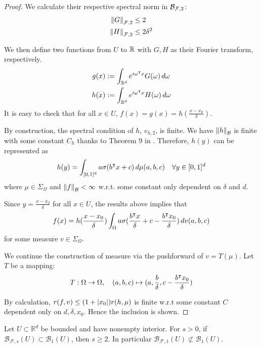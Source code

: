 \begin{proof}
We calculate their respective spectral norm in $\mathcal{B}_{\mathcal{F}, 2}$:
\begin{align}
    \left\| G \right\|_{\mathcal{F},2} &\leq 2 \\
    \left\| H \right\|_{\mathcal{F},2} &\leq 2\delta^2
\end{align}

We then define two functions from $U$ to $\mathbb{R}$ with $G,H$ as their Fourier
transform, respectively.
\begin{align*}
    g(x) &:= \int_{\mathbb{R}^d} e^{i\omega{}^{\intercal} x} G(\omega)\,d\omega\\
    h(x) &:= \int_{\mathbb{R}^d} e^{i\omega{}^{\intercal} x} H(\omega)\,d\omega\\
\end{align*}
It is easy to check that for all $x \in U$, $f(x)=g(x)=h(\frac{x-x_0}{\delta})$.

By construction, the spectral condition of $h$, $v_{h,2}$, is finite. We have
$\left\| h \right\|_{\mathcal{B}}$ is finite with some constant $C_h$ thanks to Theorem 9
in \cite{eMathematicalUnderstandingNeural2020}. Therefore, $h(y)$ can be
represented as
\begin{equation}
    h(y) = \int_{[0,1]^d} a \sigma(b{}^{\intercal} x + c) \,d\mu(a,b,c) \quad
    \forall y \in [0,1]^d
\end{equation}
where $\mu \in \Sigma_{\Omega}$ and $\left\| f \right\|_{\mathcal{B}} < \infty$ w.r.t. some
constant only dependent on $\delta$ and $d$.

Since $y=\frac{x-x_0}{\delta}$ for all $x\in U$, the results above implies that 
\begin{equation}
    f(x) = h(\frac{x-x_0}{\delta}) \int_{\Omega} a 
    \sigma(\frac{b{}^{\intercal} x}{\delta} + c - \frac{b{}^{\intercal} x_0}{\delta})\,dv(a,b,c)
\end{equation}
for some measure $v \in \Sigma_{\Omega}$.

We continue the construction of measure via the pushforward of $v = T(\mu)$. Let
$T$ be a mapping:
\begin{equation}
    T: \Omega \to \Omega, \quad
    (a,b,c) \mapsto (a, \frac{b}{\delta}, c - \frac{b{}^{\intercal} x_0}{\delta})
\end{equation}

By calculation, $r(f, v) \leq (1+\left| x_0 \right|) r(h, \mu)$ is finite w.r.t some
constant $C$ dependent only on $d,\delta,x_0$. Hence the inclusion is shown.

\end{proof}


\begin{proposition}

    Let $U \subset \mathbb{R}^d$ be bounded and have nonempty interior. For
    $s>0$, if $\mathcal{B}_{\mathcal{F},s}(U) \subset \mathcal{B}_{1}(U)$, then
    $s \geq 2$. In particular $\mathcal{B}_{\mathcal{F},1}(U) \not\subset
    \mathcal{B}_{1}(U)$.
\end{proposition}

